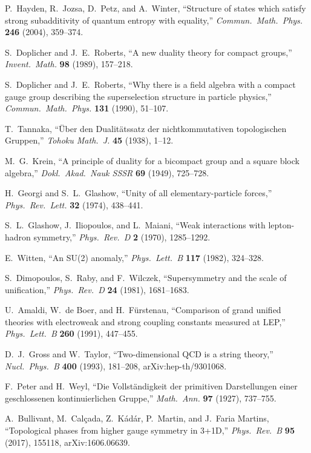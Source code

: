 P.~Hayden, R.~Jozsa, D.~Petz, and A.~Winter,
``Structure of states which satisfy strong subadditivity of quantum entropy with equality,''
\emph{Commun.\ Math.\ Phys.} \textbf{246} (2004), 359--374.

S.~Doplicher and J.~E.~Roberts,
``A new duality theory for compact groups,''
\emph{Invent.\ Math.} \textbf{98} (1989), 157--218.

S.~Doplicher and J.~E.~Roberts,
``Why there is a field algebra with a compact gauge group describing the superselection structure in particle physics,''
\emph{Commun.\ Math.\ Phys.} \textbf{131} (1990), 51--107.

T.~Tannaka,
``\"Uber den Dualit\"atssatz der nichtkommutativen topologischen Gruppen,''
\emph{Tohoku Math.\ J.} \textbf{45} (1938), 1--12.

M.~G.~Krein,
``A principle of duality for a bicompact group and a square block algebra,''
\emph{Dokl.\ Akad.\ Nauk SSSR} \textbf{69} (1949), 725--728.

H.~Georgi and S.~L.~Glashow,
``Unity of all elementary-particle forces,''
\emph{Phys.\ Rev.\ Lett.} \textbf{32} (1974), 438--441.

S.~L.~Glashow, J.~Iliopoulos, and L.~Maiani,
``Weak interactions with lepton-hadron symmetry,''
\emph{Phys.\ Rev.\ D} \textbf{2} (1970), 1285--1292.

E.~Witten,
``An SU(2) anomaly,''
\emph{Phys.\ Lett.\ B} \textbf{117} (1982), 324--328.

S.~Dimopoulos, S.~Raby, and F.~Wilczek,
``Supersymmetry and the scale of unification,''
\emph{Phys.\ Rev.\ D} \textbf{24} (1981), 1681--1683.

U.~Amaldi, W.~de Boer, and H.~F\"urstenau,
``Comparison of grand unified theories with electroweak and strong coupling constants measured at LEP,''
\emph{Phys.\ Lett.\ B} \textbf{260} (1991), 447--455.

D.~J.~Gross and W.~Taylor,
``Two-dimensional QCD is a string theory,''
\emph{Nucl.\ Phys.\ B} \textbf{400} (1993), 181--208,
arXiv:hep-th/9301068.

F.~Peter and H.~Weyl,
``Die Vollst\"andigkeit der primitiven Darstellungen einer geschlossenen kontinuierlichen Gruppe,''
\emph{Math.\ Ann.} \textbf{97} (1927), 737--755.

A.~Bullivant, M.~Cal\c{c}ada, Z.~K\'ad\'ar, P.~Martin, and J.~Faria Martins,
``Topological phases from higher gauge symmetry in 3+1D,''
\emph{Phys.\ Rev.\ B} \textbf{95} (2017), 155118,
arXiv:1606.06639.


